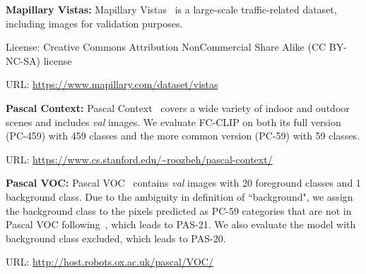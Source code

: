 \documentclass{article}
\newcommand{\modelname}{FC-CLIP\xspace}
\begin{document}
\noindent\textbf{Mapillary Vistas:}\quad
Mapillary Vistas~\cite{neuhold2017mapillary} is a large-scale traffic-related dataset, including  images for validation purposes.

License: Creative Commons Attribution NonCommercial Share Alike (CC BY-NC-SA) license

URL: \url{https://www.mapillary.com/dataset/vistas}

\noindent\textbf{Pascal Context:} \quad
Pascal Context~\cite{mottaghi2014role} covers a wide variety of indoor and outdoor scenes and includes  \textit{val} images. We evaluate \modelname on both its full version (PC-459) with 459 classes and the more common version (PC-59) with 59 classes.

URL: \url{https://www.cs.stanford.edu/~roozbeh/pascal-context/}

\noindent\textbf{Pascal VOC:} \quad
Pascal VOC~\cite{everingham2010pascal} contains  \textit{val} images with 20 foreground classes and 1 background class. Due to the ambiguity in definition of ``background", we assign the background class to the pixels predicted as PC-59 categories that are not in Pascal VOC following~\cite{ghiasi2022scaling}, which leads to PAS-21. We also evaluate the model with background class excluded, which leads to PAS-20.

URL: \url{http://host.robots.ox.ac.uk/pascal/VOC/} 
\end{document}
